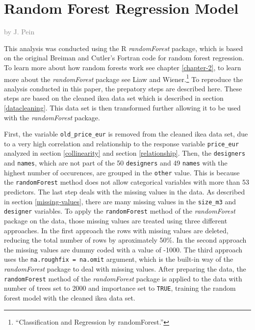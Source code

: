 \documentclass[a4paper, nobind]{templates/ociamthesis}
\begin{document}
\hypertarget{rf}{%
\section{Random Forest Regression Model}\label{rf}}

\textcolor{gray}{by J. Pein}

This analysis was conducted using the R \emph{randomForest} package, which is based on the original Breiman and Cutler's Fortran code for random forest regression. To learn more about how random forests work see chapter \ref{chapter-2}, to learn more about the \emph{randomForest} package see Liaw and Wiener.\footnote{``Classification and Regression by randomForest.''} To reproduce the analysis conducted in this paper, the prepatory steps are described here. These steps are based on the cleaned ikea data set which is described in section \ref{datacleaning}. This data set is then transformed further allowing it to be used with the \emph{randomForest} package.

First, the variable \texttt{old\_price\_eur} is removed from the cleaned ikea data set, due to a very high correlation and relationship to the response variable \texttt{price\_eur} analyzed in section \ref{collinearity} and section \ref{relationship}. Then, the \texttt{designers} and \texttt{names}, which are not part of the 50 \texttt{designers} and 49 \texttt{names} with the highest number of occurences, are grouped in the \texttt{other} value. This is because the \texttt{randomForest} method does not allow categorical variables with more than 53 predictors. The last step deals with the missing values in the data. As described in section \ref{missing-values}, there are many missing values in the \texttt{size\_m3} and \texttt{designer} variables. To apply the \texttt{randomForest} method of the \emph{randomForest} package on the data, those missing values are treated using three different approaches. In the first approach the rows with missing values are deleted, reducing the total number of rows by aproximately 50\%. In the second approach the missing values are dummy coded with a value of -1000. The third approach uses the \texttt{na.roughfix\ =\ na.omit} argument, which is the built-in way of the \emph{randomForest} package to deal with missing values.
After preparing the data, the \texttt{randomForest} method of the \emph{randomForest} package is applied to the data with number of trees set to 2000 and importance set to \texttt{TRUE}, training the random forest model with the cleaned ikea data set.
\end{document}

